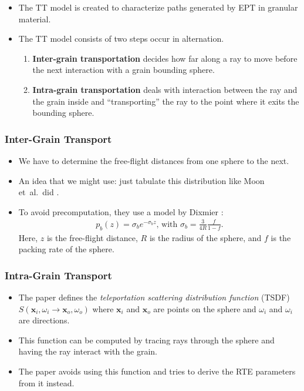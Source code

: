 \documentclass[10pt]{article}
\newcommand{\ve}[1]{\mathbf{#1}}
\newcommand{\etal}{{et~al.}}
\newcommand{\ra}{\rightarrow}
\begin{document}
  \begin{itemize}
  	\item The TT model is created to characterize paths generated by EPT in granular material.

  	\item The TT model consists of two steps occur in alternation.
  	\begin{enumerate}
  		\item {\bf Inter-grain transportation} decides how far along a ray to move before the next interaction with a grain bounding sphere.
  		\item {\bf Intra-grain transportation} deals with interaction between the ray and the grain inside and ``transporting'' the ray to the point where it exits the bounding sphere.
  	\end{enumerate}  	
  \end{itemize}

  \subsubsection{Inter-Grain Transport}
  \begin{itemize}
  	\item We have to determine the free-flight distances from one sphere to the next.

  	\item An idea that we might use: just tabulate this distribution like Moon \etal\ did \cite{Moon:2007}. 

  	\item To avoid precomputation, they use a model by Dixmier \cite{Dixmier:1978}:
  	\begin{align*}
  		p_b(z) = \sigma_b e^{-\sigma_b z}\mbox{, with } \sigma_b = \frac{3}{4R}\frac{f}{1-f}.
  	\end{align*}
  	Here, $z$ is the free-flight distance, $R$ is the radius of the sphere, and $f$ is the packing rate of the sphere.  	
  \end{itemize}

  \subsubsection{Intra-Grain Transport}
  \begin{itemize}
  	\item The paper defines the \emph{teleportation scattering distribution function} (TSDF) $S(\ve{x}_i, \omega_i \ra \ve{x}_o, \omega_o)$ where $\ve{x}_i$ and $\ve{x}_o$ are points on the sphere and $\omega_i$ and $\omega_i$ are directions.

  	\item This function can be computed by tracing rays through the sphere and having the ray interact with the grain.

  	\item The paper avoids using this function and tries to derive the RTE parameters from it instead.
  \end{itemize}
\end{document}
